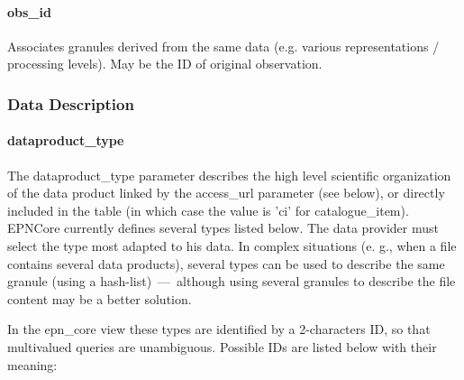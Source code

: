 \documentclass[11pt,a4paper]{ivoa}
\begin{document}
\paragraph{obs\_id}

Associates granules derived from the same data (e.g. various representations / processing levels). May be the ID of original observation.

\subsubsection{Data Description}

\paragraph{dataproduct\_type}

The dataproduct\_type parameter describes the high level scientific organization of the data product linked by the access\_url parameter (see below), or directly included in the table (in which case the value is 'ci' for catalogue\_item). EPNCore currently defines several types listed below. The data provider must select the type most adapted to his data. In complex situations (e. g., when a file contains several data products), several types can be used to describe the same granule (using a hash-list) — although using several granules to describe the file content may be a better solution.

In the epn\_core view these types are identified by a 2-characters ID, so that multivalued queries are unambiguous. Possible IDs are listed below with their meaning:
\end{document}
